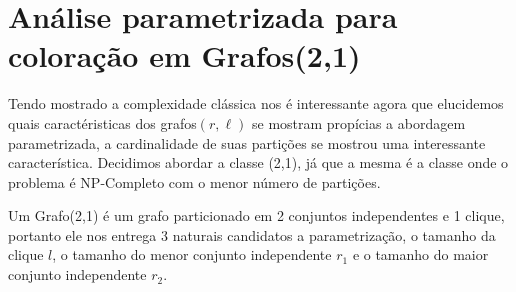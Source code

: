 \chapter{Análise parametrizada para coloração em Grafos(2,1)}
Tendo mostrado a complexidade clássica nos é interessante agora que elucidemos quais caractéristicas dos grafos$(r,\ell)$ se mostram propícias a abordagem parametrizada, a cardinalidade de suas partições se mostrou uma interessante característica.
Decidimos abordar a classe (2,1), já que a mesma é a classe onde o problema é NP-Completo com o menor número de partições.

Um Grafo(2,1) é um grafo particionado em 2 conjuntos independentes e 1 clique, portanto ele nos entrega 3 naturais candidatos a parametrização, o tamanho da clique $l$, o tamanho do menor conjunto independente $r_1$ e o tamanho do maior conjunto independente $r_2$.

